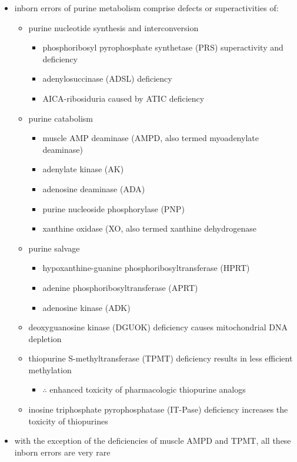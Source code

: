\documentclass[12pt]{scrartcl}
\begin{document}
\begin{itemize}
\item inborn errors of purine metabolism comprise defects or
superactivities of:

\begin{itemize}
\item purine nucleotide synthesis and interconversion
\begin{itemize}
\item phosphoribosyl pyrophosphate synthetase (PRS) superactivity and deficiency
\item adenylosuccinase (ADSL) deficiency
\item AICA-ribosiduria caused by ATIC deficiency
\end{itemize}
\item purine catabolism
\begin{itemize}
\item muscle AMP deaminase (AMPD, also termed myoadenylate deaminase)
\item adenylate kinase (AK)
\item adenosine deaminase (ADA)
\item purine nucleoside phosphorylase (PNP)
\item xanthine oxidase (XO, also termed xanthine dehydrogenase
\end{itemize}
\item purine salvage
\begin{itemize}
\item hypoxanthine-guanine phosphoribosyltransferase (HPRT)
\item adenine phosphoribosyltransferase (APRT)
\item adenosine kinase (ADK)
\end{itemize}
\item deoxyguanosine kinase (DGUOK) deficiency causes mitochondrial DNA depletion
\item thiopurine S-methyltransferase (TPMT) deficiency results in less
efficient methylation
\begin{itemize}
\item \(\therefore\) enhanced toxicity of pharmacologic thiopurine analogs
\end{itemize}
\item inosine triphosphate pyrophosphatase (IT-Pase) deficiency
increases the toxicity of thiopurines
\end{itemize}
\item with the exception of the deficiencies of muscle AMPD and TPMT, all
these inborn errors are very rare
\end{itemize}
\end{document}
